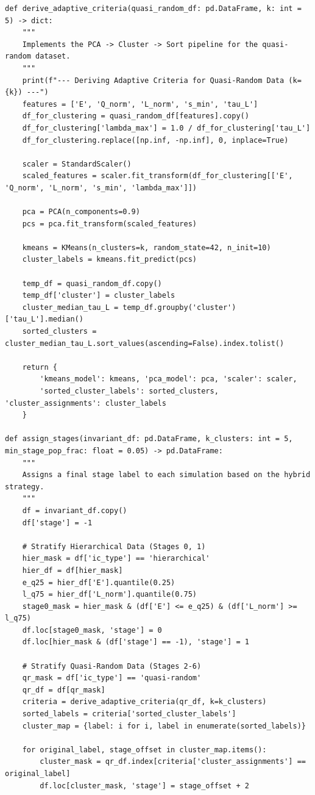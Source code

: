 \begin{lstlisting}
def derive_adaptive_criteria(quasi_random_df: pd.DataFrame, k: int = 5) -> dict:
    """
    Implements the PCA -> Cluster -> Sort pipeline for the quasi-random dataset.
    """
    print(f"--- Deriving Adaptive Criteria for Quasi-Random Data (k={k}) ---")
    features = ['E', 'Q_norm', 'L_norm', 's_min', 'tau_L']
    df_for_clustering = quasi_random_df[features].copy()
    df_for_clustering['lambda_max'] = 1.0 / df_for_clustering['tau_L']
    df_for_clustering.replace([np.inf, -np.inf], 0, inplace=True)

    scaler = StandardScaler()
    scaled_features = scaler.fit_transform(df_for_clustering[['E', 'Q_norm', 'L_norm', 's_min', 'lambda_max']])

    pca = PCA(n_components=0.9)
    pcs = pca.fit_transform(scaled_features)

    kmeans = KMeans(n_clusters=k, random_state=42, n_init=10)
    cluster_labels = kmeans.fit_predict(pcs)

    temp_df = quasi_random_df.copy()
    temp_df['cluster'] = cluster_labels
    cluster_median_tau_L = temp_df.groupby('cluster')['tau_L'].median()
    sorted_clusters = cluster_median_tau_L.sort_values(ascending=False).index.tolist()

    return {
        'kmeans_model': kmeans, 'pca_model': pca, 'scaler': scaler,
        'sorted_cluster_labels': sorted_clusters, 'cluster_assignments': cluster_labels
    }

def assign_stages(invariant_df: pd.DataFrame, k_clusters: int = 5, min_stage_pop_frac: float = 0.05) -> pd.DataFrame:
    """
    Assigns a final stage label to each simulation based on the hybrid strategy.
    """
    df = invariant_df.copy()
    df['stage'] = -1

    # Stratify Hierarchical Data (Stages 0, 1)
    hier_mask = df['ic_type'] == 'hierarchical'
    hier_df = df[hier_mask]
    e_q25 = hier_df['E'].quantile(0.25)
    l_q75 = hier_df['L_norm'].quantile(0.75)
    stage0_mask = hier_mask & (df['E'] <= e_q25) & (df['L_norm'] >= l_q75)
    df.loc[stage0_mask, 'stage'] = 0
    df.loc[hier_mask & (df['stage'] == -1), 'stage'] = 1

    # Stratify Quasi-Random Data (Stages 2-6)
    qr_mask = df['ic_type'] == 'quasi-random'
    qr_df = df[qr_mask]
    criteria = derive_adaptive_criteria(qr_df, k=k_clusters)
    sorted_labels = criteria['sorted_cluster_labels']
    cluster_map = {label: i for i, label in enumerate(sorted_labels)}

    for original_label, stage_offset in cluster_map.items():
        cluster_mask = qr_df.index[criteria['cluster_assignments'] == original_label]
        df.loc[cluster_mask, 'stage'] = stage_offset + 2


\end{lstlisting}
